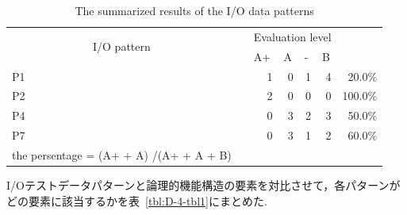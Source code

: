 \begin{table}[htbp]
\centering
\caption{The summarized results of the I/O data patterns}
  \begin{tabular}{lrrrrrr}
\cline{1-6}    \multicolumn{1}{|c}{\multirow{2}[4]{*}{I/O pattern}} & \multicolumn{1}{r|}{} & \multicolumn{4}{c|}{Evaluation level} &  \bigstrut\\
\cline{3-6}    \multicolumn{1}{|c}{} & \multicolumn{1}{r|}{} & \multicolumn{1}{l|}{A+} & \multicolumn{1}{l|}{A} & \multicolumn{1}{l|}{-} & \multicolumn{1}{l|}{B} &  \bigstrut\\
\cline{1-6}    \multicolumn{1}{|l|}{P1} & \multicolumn{1}{r|}{} & \multicolumn{1}{r|}{1} & \multicolumn{1}{r|}{0} & \multicolumn{1}{r|}{1} & \multicolumn{1}{r|}{4} & 20.0\% \bigstrut\\
\cline{1-6}    \multicolumn{1}{|l|}{P2} & \multicolumn{1}{r|}{} & \multicolumn{1}{r|}{2} & \multicolumn{1}{r|}{0} & \multicolumn{1}{r|}{0} & \multicolumn{1}{r|}{0} & 100.0\% \bigstrut\\
\cline{1-6}    \multicolumn{1}{|l|}{P4} & \multicolumn{1}{r|}{} & \multicolumn{1}{r|}{0} & \multicolumn{1}{r|}{3} & \multicolumn{1}{r|}{2} & \multicolumn{1}{r|}{3} & 50.0\% \bigstrut\\
\cline{1-6}    \multicolumn{1}{|l|}{P7} & \multicolumn{1}{r|}{} & \multicolumn{1}{r|}{0} & \multicolumn{1}{r|}{3} & \multicolumn{1}{r|}{1} & \multicolumn{1}{r|}{2} & 60.0\% \bigstrut\\
\cline{1-6}    the persentage = (A+  +  A) /(A+  +  A + B)  &       &       &       &       &       &  \bigstrut[t]\\
  \end{tabular}%
\label{tbl:D-3-tbl10}%
\end{table}%











I/Oテストデータパターンと論理的機能構造の要素を対比させて，各パターンがどの要素に該当するかを表~\ref{tbl:D-4-tbl1}にまとめた.


